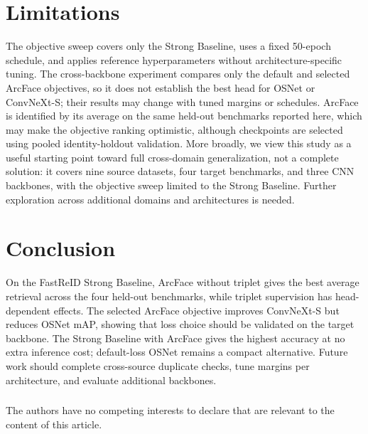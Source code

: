 \documentclass{llncs}
\begin{document}
\section{Limitations}
\label{sec:limitations}

The objective sweep covers only the Strong Baseline, uses a fixed 50-epoch schedule, and applies reference hyperparameters without architecture-specific tuning. The cross-backbone experiment compares only the default and selected ArcFace objectives, so it does not establish the best head for OSNet or ConvNeXt-S; their results may change with tuned margins or schedules. ArcFace is identified by its average on the same held-out benchmarks reported here, which may make the objective ranking optimistic, although checkpoints are selected using pooled identity-holdout validation. More broadly, we view this study as a useful starting point toward full cross-domain generalization, not a complete solution: it covers nine source datasets, four target benchmarks, and three CNN backbones, with the objective sweep limited to the Strong Baseline. Further exploration across additional domains and architectures is needed.

\section{Conclusion}
\label{sec:conclusion}

On the FastReID Strong Baseline, ArcFace without triplet gives the best average retrieval across the four held-out benchmarks, while triplet supervision has head-dependent effects. The selected ArcFace objective improves ConvNeXt-S but reduces OSNet mAP, showing that loss choice should be validated on the target backbone. The Strong Baseline with ArcFace gives the highest accuracy at no extra inference cost; default-loss OSNet remains a compact alternative. Future work should complete cross-source duplicate checks, tune margins per architecture, and evaluate additional backbones.

\begin{credits}
\subsubsection{\discintname}
The authors have no competing interests to declare that are relevant to the content of this article.
\end{credits}



\end{document}
